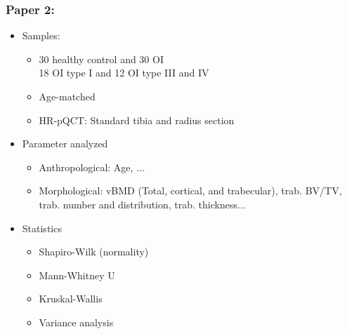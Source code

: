 \documentclass[xcolor=table]{beamer}
\begin{document}

\begin{frame}
	\frametitle{Paper 2: \cite{p5}}
	\begin{itemize}[label=$\bullet$]
		\item Samples:
		\begin{itemize}[label=$-$]
			\item 30 healthy control and 30 OI\\
			18 OI type I and 12 OI type III and IV
			\item Age-matched
			\item HR-pQCT: Standard tibia and radius section
		\end{itemize}
		\item Parameter analyzed
		\begin{itemize}[label=$-$]
			\item Anthropological: Age, ...
			\item Morphological: vBMD (Total, cortical, and trabecular), trab. BV/TV, trab. number and distribution, trab. thickness...
		\end{itemize}
		\item Statistics
		\begin{itemize}[label=$-$]
			\item Shapiro-Wilk (normality)
			\item Mann-Whitney U
			\item Kruskal-Wallis
			\item Variance analysis
		\end{itemize}
	\end{itemize}
\end{frame}

\end{document}
